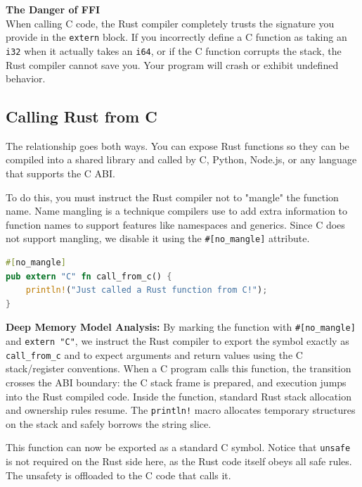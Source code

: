 \begin{warningbox}
\textbf{The Danger of FFI}\\
When calling C code, the Rust compiler completely trusts the signature you provide in the \texttt{extern} block. If you incorrectly define a C function as taking an \texttt{i32} when it actually takes an \texttt{i64}, or if the C function corrupts the stack, the Rust compiler cannot save you. Your program will crash or exhibit undefined behavior.
\end{warningbox}

\subsection{Calling Rust from C}

The relationship goes both ways. You can expose Rust functions so they can be compiled into a shared library and called by C, Python, Node.js, or any language that supports the C ABI.

To do this, you must instruct the Rust compiler not to "mangle" the function name. Name mangling is a technique compilers use to add extra information to function names to support features like namespaces and generics. Since C does not support mangling, we disable it using the \texttt{\#[no\_mangle]} attribute.

\begin{lstlisting}[language=Rust]
#[no_mangle]
pub extern "C" fn call_from_c() {
    println!("Just called a Rust function from C!");
}
\end{lstlisting}

\textbf{Deep Memory Model Analysis:}
By marking the function with \texttt{\#[no\_mangle]} and \texttt{extern "C"}, we instruct the Rust compiler to export the symbol exactly as \texttt{call\_from\_c} and to expect arguments and return values using the C stack/register conventions. When a C program calls this function, the transition crosses the ABI boundary: the C stack frame is prepared, and execution jumps into the Rust compiled code. Inside the function, standard Rust stack allocation and ownership rules resume. The \texttt{println!} macro allocates temporary structures on the stack and safely borrows the string slice. 

This function can now be exported as a standard C symbol. Notice that \texttt{unsafe} is not required on the Rust side here, as the Rust code itself obeys all safe rules. The unsafety is offloaded to the C code that calls it.

